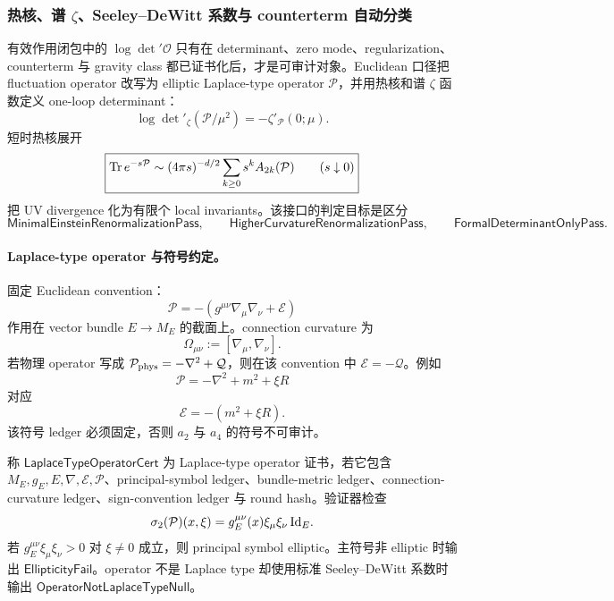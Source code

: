 \subsubsection{热核、谱 \(\zeta\)、Seeley--DeWitt 系数与 counterterm 自动分类}\label{subsubsec:typed-address-biaxial-completion-heat-kernel-zeta-counterterm-classification}
有效作用闭包中的 \(\log\det{}'\mathcal O\) 只有在 determinant、zero mode、regularization、counterterm 与 gravity class 都已证书化后，才是可审计对象。Euclidean 口径把 fluctuation operator 改写为 elliptic Laplace-type operator \(\mathcal P\)，并用热核和谱 \(\zeta\) 函数定义 one-loop determinant：
\[
\boxed{
\log\det{}'_\zeta(\mathcal P/\mu^2)
=
-\zeta'_{\mathcal P}(0;\mu).
}
\]
短时热核展开
\[
\boxed{
{\rm Tr}\,e^{-s\mathcal P}
\sim
(4\pi s)^{-d/2}
\sum_{k\ge0}s^kA_{2k}(\mathcal P)
\qquad(s\downarrow0)
}
\]
把 UV divergence 化为有限个 local invariants。该接口的判定目标是区分
\[
\mathsf{MinimalEinsteinRenormalizationPass},
\qquad
\mathsf{HigherCurvatureRenormalizationPass},
\qquad
\mathsf{FormalDeterminantOnlyPass}.
\]

\paragraph{Laplace-type operator 与符号约定。}
固定 Euclidean convention：
\[
\boxed{
\mathcal P=-(g^{\mu\nu}\nabla_\mu\nabla_\nu+\mathcal E)
}
\]
作用在 vector bundle \(E\to M_E\) 的截面上。connection curvature 为
\[
\Omega_{\mu\nu}:=[\nabla_\mu,\nabla_\nu].
\]
若物理 operator 写成 \(\mathcal P_{\rm phys}=-\nabla^2+\mathcal Q\)，则在该 convention 中 \(\mathcal E=-\mathcal Q\)。例如
\[
\mathcal P=-\nabla^2+m^2+\xi R
\]
对应
\[
\mathcal E=-(m^2+\xi R).
\]
该符号 ledger 必须固定，否则 \(a_2\) 与 \(a_4\) 的符号不可审计。

\begin{definition}\label{def:typed-address-biaxial-completion-laplace-type-operator-cert}
称 \(\mathsf{LaplaceTypeOperatorCert}\) 为 Laplace-type operator 证书，若它包含 \(M_E,g_E,E,\nabla,\mathcal E,\mathcal P\)、principal-symbol ledger、bundle-metric ledger、connection-curvature ledger、sign-convention ledger 与 round hash。验证器检查
\[
\sigma_2(\mathcal P)(x,\xi)
=
g_E^{\mu\nu}(x)\xi_\mu\xi_\nu\,{\rm Id}_E.
\]
若 \(g_E^{\mu\nu}\xi_\mu\xi_\nu>0\) 对 \(\xi\ne0\) 成立，则 principal symbol elliptic。主符号非 elliptic 时输出 \(\mathsf{EllipticityFail}\)。operator 不是 Laplace type 却使用标准 Seeley--DeWitt 系数时输出 \(\mathsf{OperatorNotLaplaceTypeNull}\)。
\end{definition}

